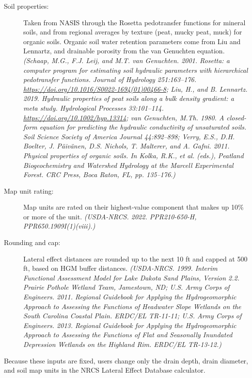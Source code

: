 \documentclass{theme/arpc-memo}
\begin{document}
\begin{description}
\item[Soil properties:] Taken from NASIS through the Rosetta pedotransfer functions for mineral soils, and from regional averages by texture (peat, mucky peat, muck) for organic soils. Organic soil water retention parameters come from Liu and Lennartz, and drainable porosity from the van Genuchten equation. \textit{(Schaap, M.G., F.J. Leij, and M.T. van Genuchten. 2001. Rosetta: a computer program for estimating soil hydraulic parameters with hierarchical pedotransfer functions. Journal of Hydrology 251:163--176. \url{https://doi.org/10.1016/S0022-1694(01)00466-8}; Liu, H., and B. Lennartz. 2019. Hydraulic properties of peat soils along a bulk density gradient: a meta study. Hydrological Processes 33:101--114. \url{https://doi.org/10.1002/hyp.13314}; van Genuchten, M.Th. 1980. A closed-form equation for predicting the hydraulic conductivity of unsaturated soils. Soil Science Society of America Journal 44:892--898; Verry, E.S., D.H. Boelter, J. P\"aiv\"anen, D.S. Nichols, T. Malterer, and A. Gafni. 2011. Physical properties of organic soils. In Kolka, R.K., et al. (eds.), Peatland Biogeochemistry and Watershed Hydrology at the Marcell Experimental Forest. CRC Press, Boca Raton, FL, pp. 135--176.)}

\item[Map unit rating:] Map units are rated on their highest-value component that makes up 10\% or more of the unit. \textit{(USDA-NRCS. 2022. PPR210-650-H, PPR650.1909I(1)(viii).)}

\item[Rounding and cap:] Lateral effect distances are rounded up to the next 10 ft and capped at 500 ft, based on HGM buffer distances. \textit{(USDA-NRCS. 1999. Interim Functional Assessment Model for Lake Dakota Sand Plains, Version 2.2. Prairie Pothole Wetland Team, Jamestown, ND; U.S. Army Corps of Engineers. 2011. Regional Guidebook for Applying the Hydrogeomorphic Approach to Assessing the Functions of Headwater Slope Wetlands on the South Carolina Coastal Plain. ERDC/EL TR-11-11; U.S. Army Corps of Engineers. 2013. Regional Guidebook for Applying the Hydrogeomorphic Approach to Assessing the Functions of Flat and Seasonally Inundated Depression Wetlands on the Highland Rim. ERDC/EL TR-13-12.)}

\end{description}

Because these inputs are fixed, users change only the drain depth, drain diameter, and soil map units in the NRCS Lateral Effect Database calculator.
\end{document}
